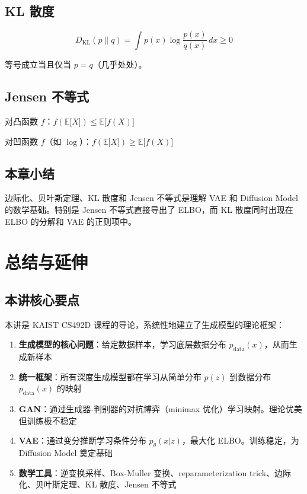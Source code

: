 \documentclass[a4paper]{article}
\begin{document}
\subsection{KL 散度}

$$D_{\mathrm{KL}}(p \| q) = \int p(x) \log \frac{p(x)}{q(x)} \, dx \geq 0$$

等号成立当且仅当 $p = q$（几乎处处）。

\subsection{Jensen 不等式}

对凸函数 $f$：$f(\mathbb{E}{[}X{]}) \leq \mathbb{E}{[}f(X){]}$

对凹函数 $f$（如 $\log$）：$f(\mathbb{E}{[}X{]}) \geq \mathbb{E}{[}f(X){]}$

\subsection{本章小结}

边际化、贝叶斯定理、KL 散度和 Jensen 不等式是理解 VAE 和 Diffusion Model 的数学基础。特别是 Jensen 不等式直接导出了 ELBO，而 KL 散度同时出现在 ELBO 的分解和 VAE 的正则项中。

\newpage
\section{总结与延伸}

\subsection{本讲核心要点}

本讲是 KAIST CS492D 课程的导论，系统性地建立了生成模型的理论框架：

\begin{enumerate}
    \item \textbf{生成模型的核心问题}：给定数据样本，学习底层数据分布 $p_{\text{data}}(x)$，从而生成新样本
    \item \textbf{统一框架}：所有深度生成模型都在学习从简单分布 $p(z)$ 到数据分布 $p_{\text{data}}(x)$ 的映射
    \item \textbf{GAN}：通过生成器-判别器的对抗博弈（minimax 优化）学习映射。理论优美但训练极不稳定
    \item \textbf{VAE}：通过变分推断学习条件分布 $p_\theta(x|z)$，最大化 ELBO。训练稳定，为 Diffusion Model 奠定基础
    \item \textbf{数学工具}：逆变换采样、Box-Muller 变换、reparameterization trick、边际化、贝叶斯定理、KL 散度、Jensen 不等式
\end{enumerate}
\end{document}
